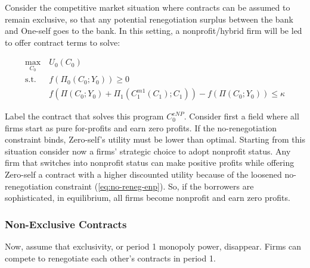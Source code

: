 \documentclass[11pt,english]{article}
\theoremstyle{plain}
\theoremstyle{definition}
\begin{document}
Consider the competitive market situation where contracts can be assumed to remain exclusive, so that any potential renegotiation surplus between the bank and One-self
goes to the bank.
In this setting, a nonprofit/hybrid firm will be led to offer contract
terms to solve: 

\begin{align}
\underset{C_{0}}{\text{max}} & \ U_{0}\left(C_{0}\right)\\
\text{s.t.} & \ f\left(\Pi_{0}(C_{0};Y_{0})\right)\geq0\\
 & \ f\left(\Pi\left(C_{0};Y_{0}\right)+\Pi_{1}\left(C_{1}^{m1}\left(C_{1}\right);C_{1}\right)\right)-f\left(\Pi\left(C_{0};Y_{0}\right)\right)\leq\kappa\label{eq:no-reneg-enp}
\end{align}

Label the contract that solves this program  $C_{0}^{eNP}$. Consider first a field where all firms start as pure for-profits
and earn zero profits. If the no-renegotiation constraint binds, Zero-self's
utility must be lower than optimal. Starting from this situation consider
now a firms' strategic choice to adopt nonprofit status.
Any firm that switches into nonprofit status can make positive
profits while offering Zero-self a contract with a higher discounted
utility because of the loosened no-renegotiation constraint (\ref{eq:no-reneg-enp}).
So, if the borrowers are sophisticated, in equilibrium,
all firms become nonprofit and earn zero profits.

\subsubsection{Non-Exclusive Contracts}

Now, assume that exclusivity, or  period 1 monopoly power, disappear.
Firms can compete to renegotiate each other's contracts in period
1.
\end{document}
